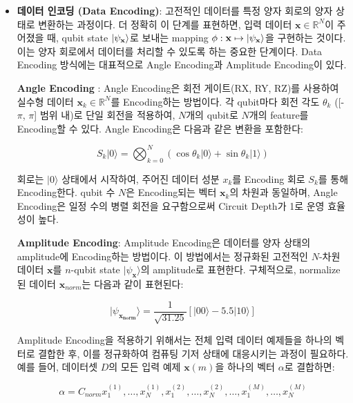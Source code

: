 \begin{itemize} %
    \item \textbf{데이터 인코딩 (Data Encoding)}: 고전적인 데이터를 특정 양자 회로의 양자 상태로 변환하는 과정이다. 더 정확히 이 단계를 표현하면, 입력 데이터 $\mathbf{x} \in \mathbb{R}^N $이 주어졌을 때, qubit state \(\ket{\psi_{\mathbf{x}}}\)로 보내는 mapping ${\phi : \mathbf{x}  \mapsto \ket{ \psi_\mathbf{x}}}$을 구현하는 것이다. 이는 양자 회로에서 데이터를 처리할 수 있도록 하는 중요한 단계이다. Data Encoding 방식에는 대표적으로 Angle Encoding과 Amplitude Encoding이 있다.

    \subitem \textbf{Angle Encoding} : %
        Angle Encoding은 회전 게이트(RX, RY, RZ)를 사용하여 실수형 데이터 \( \mathbf{x}_k \in \mathbb{R}^N \)를 Encoding하는 방법이다. 각 qubit마다 회전 각도 \( \theta_k \) ([-\(\pi\), \(\pi\)] 범위 내)로 단일 회전을 적용하여, \( N \)개의 qubit로 \( N \)개의 feature를 Encoding할 수 있다. Angle Encoding은 다음과 같은 변환을 포함한다:

        \[
        S_k |0\rangle = \bigotimes_{k=0}^{N} \left( \cos{\theta_k} |0\rangle + \sin{\theta_k} |1\rangle \right)
        \]

        회로는 \( |0\rangle \) 상태에서 시작하여, 주어진 데이터 성분 \( x_k \)를 Encoding 회로 \( S_k \)를 통해 Encoding한다. qubit 수 \( N \)은 Encoding되는 벡터 \( \mathbf{x}_k \)의 차원과 동일하며, Angle Encoding은 일정 수의 병렬 회전을 요구함으로써 Circuit Depth가 1로 운영 효율성이 높다.

    \subitem \textbf{Amplitude Encoding}:
    Amplitude Encoding은 데이터를 양자 상태의 amplitude에 Encoding하는 방법이다. 이 방법에서는 정규화된 고전적인 \( N \)-차원 데이터 \( \mathbf{x} \)를 \( n \)-qubit state \( |\psi_{\mathbf{x}}\rangle \)의 amplitude로 표현한다. 구체적으로, normalize된 데이터 \( \mathbf{x}_{norm} \)는 다음과 같이 표현된다:

    \[
    |\psi_{\mathbf{x_{norm}}}\rangle = \frac{1}{\sqrt{31.25}} \left[ |00\rangle - 5.5|10\rangle \right]
    \]

    Amplitude Encoding을 적용하기 위해서는 전체 입력 데이터 예제들을 하나의 벡터로 결합한 후, 이를 정규화하여 컴퓨팅 기저 상태에 대응시키는 과정이 필요하다. 예를 들어, 데이터셋 \( D \)의 모든 입력 예제 \( \mathbf{x}(m) \)을 하나의 벡터 \( \alpha \)로 결합하면:

    \[
    \alpha = C_{norm} x^{(1)}_1, \ldots, x^{(1)}_N, x^{(2)}_1, \ldots, x^{(2)}_N, \ldots, x^{(M)}_1, \ldots, x^{(M)}_N
    \]


\end{itemize}

